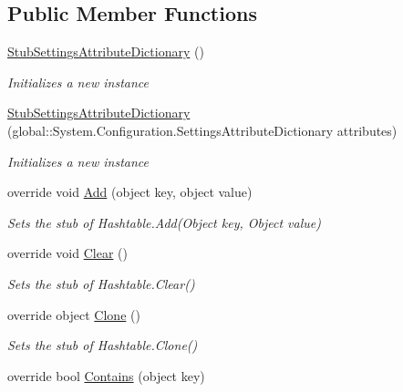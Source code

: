 \subsection*{Public Member Functions}
\begin{DoxyCompactItemize}
\item 
\hyperlink{class_system_1_1_configuration_1_1_fakes_1_1_stub_settings_attribute_dictionary_a05c3aa22239771a33f1ef5f2d853be5a}{Stub\-Settings\-Attribute\-Dictionary} ()
\begin{DoxyCompactList}\small\item\em Initializes a new instance\end{DoxyCompactList}\item 
\hyperlink{class_system_1_1_configuration_1_1_fakes_1_1_stub_settings_attribute_dictionary_a521b00ff56aefd3c5c2f8fc014cd232c}{Stub\-Settings\-Attribute\-Dictionary} (global\-::\-System.\-Configuration.\-Settings\-Attribute\-Dictionary attributes)
\begin{DoxyCompactList}\small\item\em Initializes a new instance\end{DoxyCompactList}\item 
override void \hyperlink{class_system_1_1_configuration_1_1_fakes_1_1_stub_settings_attribute_dictionary_abdda39356433dcaee76b5a03d3bb51cc}{Add} (object key, object value)
\begin{DoxyCompactList}\small\item\em Sets the stub of Hashtable.\-Add(\-Object key, Object value)\end{DoxyCompactList}\item 
override void \hyperlink{class_system_1_1_configuration_1_1_fakes_1_1_stub_settings_attribute_dictionary_a035a878cd10bd1361f95dbfa31fef061}{Clear} ()
\begin{DoxyCompactList}\small\item\em Sets the stub of Hashtable.\-Clear()\end{DoxyCompactList}\item 
override object \hyperlink{class_system_1_1_configuration_1_1_fakes_1_1_stub_settings_attribute_dictionary_aac6d2e9c0c6b5d7ef163aad9d43aaba2}{Clone} ()
\begin{DoxyCompactList}\small\item\em Sets the stub of Hashtable.\-Clone()\end{DoxyCompactList}\item 
override bool \hyperlink{class_system_1_1_configuration_1_1_fakes_1_1_stub_settings_attribute_dictionary_ac3fdf419c91b44dfa5436ed251950944}{Contains} (object key)

\end{DoxyCompactItemize}
